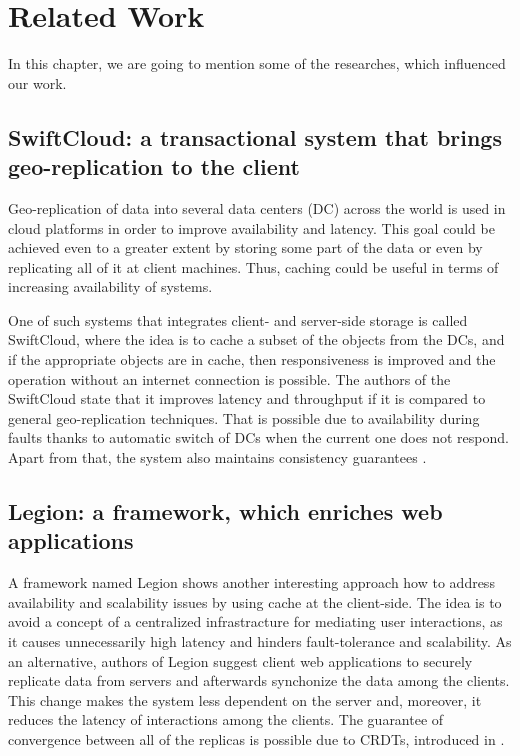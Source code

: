 \chapter{Related Work}
\label{RelatedWork}

In this chapter, we are going to mention some of the researches, which influenced our work. 

\section{SwiftCloud: a transactional system that brings geo-replication to the client}

Geo-replication of data into several data centers (DC) across the world is used in cloud platforms in order to improve availability and latency\cite{6}. This goal could be achieved even to a greater extent by storing some part of the data or even by replicating all of it at client machines. Thus, caching could be useful in terms of increasing availability of systems.

One of such systems that integrates client- and server-side storage is called SwiftCloud, where the idea is to cache a subset of the objects from the DCs, and if the appropriate objects are in cache, then responsiveness is improved and the operation without an internet connection is possible\cite{5}. The authors of the SwiftCloud state that it improves latency and throughput if it is compared to general geo-replication techniques. That is possible due to availability during faults thanks to automatic switch of DCs when the current one does not respond. Apart from that, the system also maintains consistency guarantees \cite{7}.

\section{Legion: a framework, which enriches web applications}

A framework named Legion shows another interesting approach how to address availability and scalability issues by using cache at the client-side. The idea is to avoid a concept of a centralized infrastracture for mediating user interactions, as it causes unnecessarily high latency and hinders fault-tolerance and scalability\cite{8}. As an alternative, authors of Legion suggest client web applications to securely replicate data from servers and afterwards synchonize the data among the clients. This change makes the system less dependent on the server and, moreover, it reduces the latency of interactions among the clients. The guarantee of convergence between all of the replicas is possible due to CRDTs, introduced in . 

